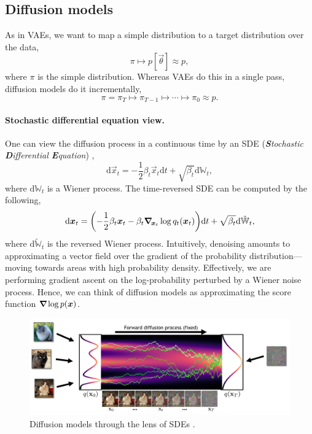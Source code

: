 \subsection{Diffusion models}

As in VAEs, we want to map a simple distribution to a target distribution over the data, \[
    \pi \mapsto p[\vec{\theta}] \approx p,
\]
where $\pi$ is the simple distribution. Whereas VAEs do this in a single pass, diffusion models do it incrementally, \[
    \pi = \pi_T \mapsto \pi_{T-1} \mapsto \cdots \mapsto \pi_0 \approx p.
\]

\paragraph{Stochastic differential equation view.}

One can view the diffusion process in a continuous time by an SDE (\textit{\textbf{S}tochastic
\textbf{D}ifferential \textbf{E}quation}) \citep{song2019generative,song2020score}, \[
    \mathrm{d}\vec{x}_t = -\frac{1}{2} \beta_t \vec{x}_t \mathrm{d}t + \sqrt{\beta_t} \mathrm{d}\mathbb{W}_t,
\]
where $\mathrm{d}\mathbb{W}_t$ is a Wiener process. The time-reversed SDE can be computed by the following, \[
    \mathrm{d}\vec{x}_t = \lft( -\frac{1}{2} \beta_t \vec{x}_t - \beta_t \grad{\log q_t(\vec{x}_t)}{\vec{x}_t} \rgt) \mathrm{d}t + \sqrt{\beta_t} \mathrm{d} \tilde{\mathbb{W}}_t,
\]
where $\mathrm{d}\tilde{\mathbb{W}}_t$ is the reversed Wiener process. Intuitively, denoising amounts to
approximating a vector field over the gradient of the probability distribution---moving towards areas
with high probability density. Effectively, we are performing gradient ascent on the log-probability
perturbed by a Wiener noise process. Hence, we can think of diffusion models as approximating the
score function $\bm{\nabla}_{\! } \log p(\bm{x})$.

\begin{figure}[h]
    \centering
    \includegraphics[width=\textwidth]{figures/sde}
    \caption{Diffusion models through the lens of SDEs \citep{song2020score}.}
    \label{fig:sde}
\end{figure}


